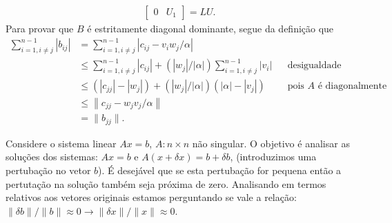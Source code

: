 \documentclass[a4paper,12pt, leqno, answers]{exam}
\begin{document}
\begin{questions}
\begin{solution}
\begin{align*}
\begin{bmatrix}
                0 & U_1
            \end{bmatrix} = L U.
        \end{align*}
        Para provar que $B$ \'{e} estritamente diagonal dominante, segue da defini\c{c}\~{a}o que
        \begin{align*}
            \sum_{i = 1, i \neq j}^{n - 1} | b_{ij} | &= \sum_{i = 1, i \neq j}^{n - 1} | c_{ij} - v_i w_j / \alpha | \\
            &\leq \sum_{i = 1, i \neq j}^{n - 1} | c_{ij} | + \left( | w_j | / | \alpha | \right) \sum_{i = 1, i \neq j}^{n - 1} | v_i | && \text{desigualdade triangular} \\
            &\leq \left( | c_{jj} | - | w_j | \right) + \left( | w_j | / | \alpha | \right) \left( | \alpha | - | v_j | \right) && \text{pois $A$ \'{e} diagonalmente dominante} \\
            &\leq \left\| c_{jj} - w_j v_j / \alpha \right\| \\
            &= \| b_{jj} \|.
        \end{align*}
    \end{solution}

    \question Considere o sistema linear $A x = b$, $A : n \times n$ n\~{a}o singular. O objetivo \'{e} analisar as solu\c{c}\~{o}es dos sistemas: $A x = b$ e $A (x + \delta x) = b + \delta b$, (introduzimos uma pertuba\c{c}\~{a}o no vetor $b$). \'{E} desej\'{a}vel que se esta pertuba\c{c}\~{a}o for pequena ent\~{a}o a pertuta\c{c}\~{a}o na solu\c{c}\~{a}o tamb\'{e}m seja pr\'{o}xima de zero. Analisando em termos relativos aos vetores originais estamos perguntando se vale a rela\c{c}\~{a}o: $\| \delta b\| / \| b \| \approx 0 \rightarrow \| \delta x \| / \| x \| \approx 0$.
    

\end{questions}
\end{document}
